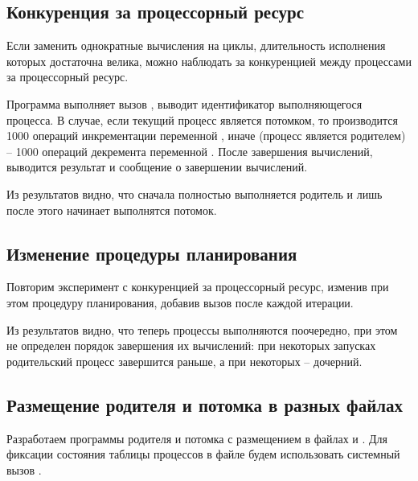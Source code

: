 \subsection{Конкуренция за процессорный ресурс}

Если заменить однократные вычисления на циклы, длительность исполнения которых достаточна велика, можно наблюдать за конкуренцией между процессами за процессорный ресурс. 



Программа выполняет вызов , выводит идентификатор выполняющегося процесса. В случае, если текущий процесс является потомком, то производится 1000 операций инкрементации переменной , иначе (процесс является родителем) -- 1000 операций декремента переменной . После завершения вычислений, выводится результат и сообщение о завершении вычислений.



Из результатов видно, что сначала полностью выполняется родитель и лишь после этого начинает выполнятся потомок.

\subsection{Изменение процедуры планирования}

Повторим эксперимент с конкуренцией за процессорный ресурс, изменив при этом процедуру планирования, добавив вызов  после каждой итерации.



Из результатов видно, что теперь процессы выполняются поочередно, при этом не определен порядок завершения их вычислений: при некоторых запусках родительский процесс завершится раньше, а при некоторых -- дочерний.



\subsection{Размещение родителя и потомка в разных файлах}
\label{sec:father-son}

Разработаем программы родителя и потомка с размещением в файлах  и . Для фиксации состояния таблицы процессов в файле будем использовать системный вызов .

